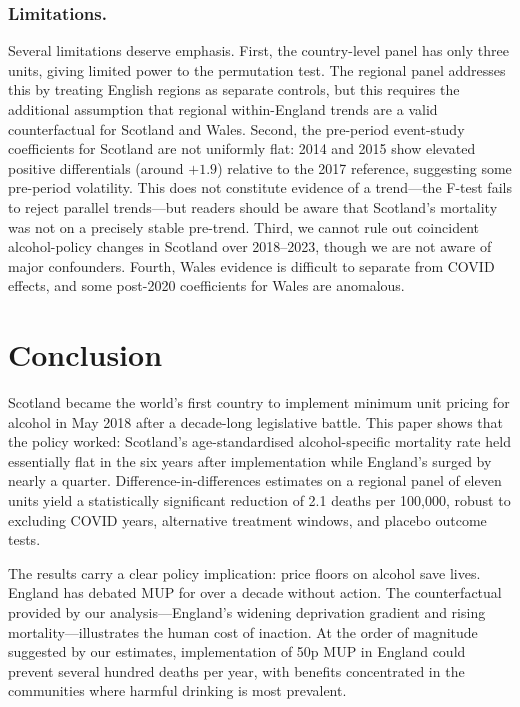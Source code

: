 \documentclass[12pt]{article}
\begin{document}
\subsubsection*{Limitations.} Several limitations deserve emphasis. First, the country-level panel has only three units, giving limited power to the permutation test. The regional panel addresses this by treating English regions as separate controls, but this requires the additional assumption that regional within-England trends are a valid counterfactual for Scotland and Wales. Second, the pre-period event-study coefficients for Scotland are not uniformly flat: 2014 and 2015 show elevated positive differentials (around $+1.9$) relative to the 2017 reference, suggesting some pre-period volatility. This does not constitute evidence of a trend---the F-test fails to reject parallel trends---but readers should be aware that Scotland's mortality was not on a precisely stable pre-trend. Third, we cannot rule out coincident alcohol-policy changes in Scotland over 2018--2023, though we are not aware of major confounders. Fourth, Wales evidence is difficult to separate from COVID effects, and some post-2020 coefficients for Wales are anomalous.

\section{Conclusion}
\label{sec:conclusion}

Scotland became the world's first country to implement minimum unit pricing for alcohol in May 2018 after a decade-long legislative battle. This paper shows that the policy worked: Scotland's age-standardised alcohol-specific mortality rate held essentially flat in the six years after implementation while England's surged by nearly a quarter. Difference-in-differences estimates on a regional panel of eleven units yield a statistically significant reduction of 2.1 deaths per 100,000, robust to excluding COVID years, alternative treatment windows, and placebo outcome tests.

The results carry a clear policy implication: price floors on alcohol save lives. England has debated MUP for over a decade without action. The counterfactual provided by our analysis---England's widening deprivation gradient and rising mortality---illustrates the human cost of inaction. At the order of magnitude suggested by our estimates, implementation of 50p MUP in England could prevent several hundred deaths per year, with benefits concentrated in the communities where harmful drinking is most prevalent.
\end{document}

